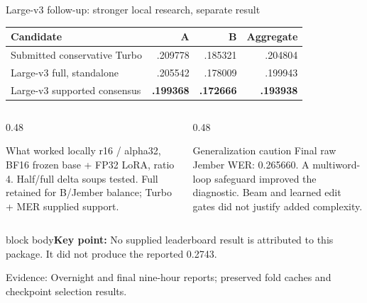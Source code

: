 \documentclass[aspectratio=169,11pt]{beamer}
\newcommand{\takeaway}[1]{\vfill\begin{beamercolorbox}[sep=2mm,wd=\linewidth]{block body}\small\textbf{Key point:} #1\end{beamercolorbox}}
\newcommand{\evidence}[1]{\vspace{1mm}\par{\tiny\color{slate}Evidence: #1\par}}
\begin{document}
\begin{frame}{Large-v3 follow-up: stronger local research, separate result}
\centering\small
\begin{tabular}{@{}lrrr@{}}\toprule
\textbf{Candidate}&\textbf{A}&\textbf{B}&\textbf{Aggregate}\\\midrule
Submitted conservative Turbo&.209778&.185321&.204804\\
Large-v3 full, standalone&.205542&.178009&.199943\\
Large-v3 supported consensus&\textbf{.199368}&\textbf{.172666}&\textbf{.193938}\\\bottomrule
\end{tabular}
\vspace{3mm}
\begin{columns}[T]
\begin{column}{0.48\textwidth}
\begin{block}{What worked locally}
\small r16 / alpha32, BF16 frozen base + FP32 LoRA, ratio 4. Half/full delta soups tested. Full retained for B/Jember balance; Turbo + MER supplied support.
\end{block}
\end{column}
\begin{column}{0.48\textwidth}
\begin{alertblock}{Generalization caution}
\small Final raw Jember WER: 0.265660. A multiword-loop safeguard improved the diagnostic. Beam and learned edit gates did not justify added complexity.
\end{alertblock}
\end{column}
\end{columns}
\takeaway{No supplied leaderboard result is attributed to this package. It did not produce the reported 0.2743.}
\evidence{Overnight and final nine-hour reports; preserved fold caches and checkpoint selection results.}
\end{frame}
\end{document}
